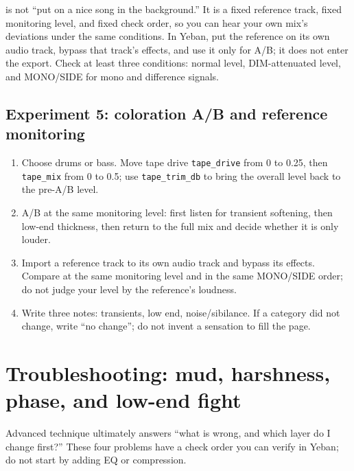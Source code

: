  is not ``put on a nice song in the background.'' It is a fixed reference track, fixed monitoring level, and fixed check order, so you can hear your own mix's deviations under the same conditions. In Yeban, put the reference on its own audio track, bypass that track's effects, and use it only for A/B; it does not enter the export. Check at least three conditions: normal level, DIM-attenuated level, and MONO/SIDE for mono and difference signals.

\subsection{Experiment 5: coloration A/B and reference monitoring}

\begin{enumerate}
  \item Choose drums or bass. Move tape drive \texttt{tape\_drive} from 0 to 0.25, then \texttt{tape\_mix} from 0 to 0.5; use \texttt{tape\_trim\_db} to bring the overall level back to the pre-A/B level.
  \item A/B at the same monitoring level: first listen for transient softening, then low-end thickness, then return to the full mix and decide whether it is only louder.
  \item Import a reference track to its own audio track and bypass its effects. Compare at the same monitoring level and in the same MONO/SIDE order; do not judge your level by the reference's loudness.
  \item Write three notes: transients, low end, noise/sibilance. If a category did not change, write ``no change''; do not invent a sensation to fill the page.
\end{enumerate}

\section{Troubleshooting: mud, harshness, phase, and low-end fight}

Advanced technique ultimately answers ``what is wrong, and which layer do I change first?'' These four problems have a check order you can verify in Yeban; do not start by adding EQ or compression.


